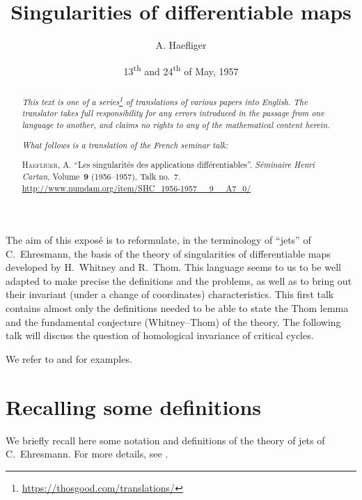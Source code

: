 \documentclass{article}
\title{Singularities of differentiable maps}
\author{A. Haefliger}
\date{13\textsuperscript{th} and 24\textsuperscript{th} of May, 1957}
\theoremstyle{plain}
\theoremstyle{definition}
\newcommand{\oldpage}[1]{\marginpar{\footnotesize$\Big\vert$ \textit{p.~#1}}}
\begin{document}
\maketitle
\thispagestyle{fancy}

\renewcommand{\abstractname}{Translator's note.}

\begin{abstract}
  \renewcommand*{\thefootnote}{\fnsymbol{footnote}}
  \emph{This text is one of a series\footnote{\url{https://thosgood.com/translations/}} of translations of various papers into English.}
  \emph{The translator takes full responsibility for any errors introduced in the passage from one language to another, and claims no rights to any of the mathematical content herein.}

  \medskip
  
  \emph{What follows is a translation of the French seminar talk:}

  \medskip\noindent
  \textsc{Haefliger, A.}
  ``Les singularit\'{e}s des applications diff\'{e}rentiables''.
  \emph{S\'{e}minaire Henri Cartan}, Volume~\textbf{9} (1956--1957), Talk no.~7.
  {\url{http://www.numdam.org/item/SHC_1956-1957__9__A7_0/}}
\end{abstract}

\setcounter{footnote}{0}

\tableofcontents
\bigskip



\oldpage{7-01}
The aim of this expos\'{e} is to reformulate, in the terminology of ``jets'' of C.~Ehresmann, the basis of the theory of singularities of differentiable maps developed by H.~Whitney and R.~Thom.
This language seems to us to be well adapted to make precise the definitions and the problems, as well as to bring out their invariant (under a change of coordinates) characteristics.
This first talk contains almost only the definitions needed to be able to state the Thom lemma and the fundamental conjecture (Whitney--Thom) of the theory.
The following talk will discuss the question of homological invariance of critical cycles.

We refer to \cite{2} and \cite{7} for examples.


\section{Recalling some definitions}
\label{section1}

We briefly recall here some notation and definitions of the theory of jets of C.~Ehresmann.
For more details, see \cite{1}.
\end{document}

